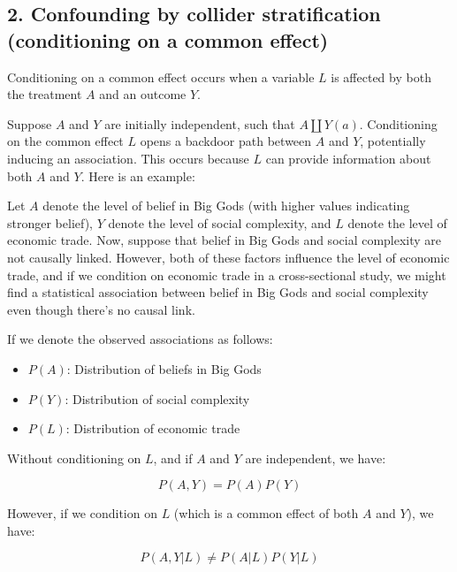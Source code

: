 \documentclass[
  singlecolumn]{report}
\providecommand{\tightlist}{%
  \setlength{\itemsep}{0pt}\setlength{\parskip}{0pt}}\usepackage{longtable,booktabs,array}
\begin{document}
\hypertarget{confounding-by-collider-stratification-conditioning-on-a-common-effect}{%
\subsection{2. Confounding by collider stratification (conditioning on a
common
effect)}\label{confounding-by-collider-stratification-conditioning-on-a-common-effect}}

Conditioning on a common effect occurs when a variable \(L\) is affected
by both the treatment \(A\) and an outcome \(Y\).

Suppose \(A\) and \(Y\) are initially independent, such that
\(A \coprod Y(a)\). Conditioning on the common effect \(L\) opens a
backdoor path between \(A\) and \(Y\), potentially inducing an
association. This occurs because \(L\) can provide information about
both \(A\) and \(Y\). Here is an example:

Let \(A\) denote the level of belief in Big Gods (with higher values
indicating stronger belief), \(Y\) denote the level of social
complexity, and \(L\) denote the level of economic trade. Now, suppose
that belief in Big Gods and social complexity are not causally linked.
However, both of these factors influence the level of economic trade,
and if we condition on economic trade in a cross-sectional study, we
might find a statistical association between belief in Big Gods and
social complexity even though there's no causal link.

If we denote the observed associations as follows:

\begin{itemize}
\tightlist
\item
  \(P(A)\): Distribution of beliefs in Big Gods
\item
  \(P(Y)\): Distribution of social complexity
\item
  \(P(L)\): Distribution of economic trade
\end{itemize}

Without conditioning on \(L\), and if \(A\) and \(Y\) are independent,
we have:

\[P(A, Y) = P(A)P(Y)\]

However, if we condition on \(L\) (which is a common effect of both
\(A\) and \(Y\)), we have:

\[P(A, Y | L) \neq P(A | L)P(Y | L)\]
\end{document}

